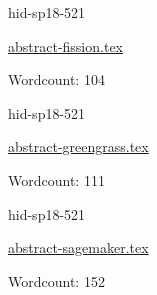 

\begin{IU}

hid-sp18-521

\href{https://github.com/cloudmesh-community/hid-sp18-521/blob/master//technology/abstract-fission.tex}{abstract-fission.tex}

 

Wordcount: 104

\end{IU}



\begin{IU}

hid-sp18-521

\href{https://github.com/cloudmesh-community/hid-sp18-521/blob/master//technology/abstract-greengrass.tex}{abstract-greengrass.tex}

 

Wordcount: 111

\end{IU}



\begin{IU}

hid-sp18-521

\href{https://github.com/cloudmesh-community/hid-sp18-521/blob/master//technology/abstract-sagemaker.tex}{abstract-sagemaker.tex}

 

Wordcount: 152

\end{IU}



